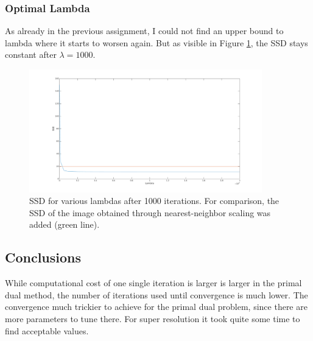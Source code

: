 \documentclass{paper}
\begin{document}
\subsubsection*{Optimal Lambda}
As already in the previous assignment, I could not find an upper bound to lambda where it starts to worsen again. But as visible in Figure \ref{fig:lambda_vs_ssd}, the SSD stays
constant after $\lambda=1000$.

\begin{figure}[ht!]%
\centering
\includegraphics[width=0.9\textwidth]{lambda_vs_ssd.png}
\caption{SSD for various lambdas after 1000 iterations. For comparison, the
SSD of the image obtained through nearest-neighbor scaling was added (green line).}
\label{fig:lambda_vs_ssd}
\end{figure}

\subsection*{Conclusions}
While computational cost of one single iteration is larger is larger 
in the primal dual method, the number of iterations used until convergence 
is much lower. The convergence much trickier to achieve for the primal dual problem,
since there are more parameters to tune there. For super resolution it took 
quite some time to find acceptable values.
\end{document}
